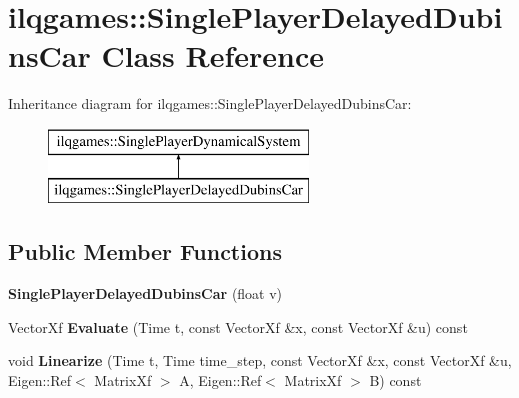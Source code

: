 \hypertarget{classilqgames_1_1_single_player_delayed_dubins_car}{}\section{ilqgames\+:\+:Single\+Player\+Delayed\+Dubins\+Car Class Reference}
\label{classilqgames_1_1_single_player_delayed_dubins_car}
Inheritance diagram for ilqgames\+:\+:Single\+Player\+Delayed\+Dubins\+Car\+:\begin{figure}[H]
\begin{center}
\leavevmode
\includegraphics[height=2.000000cm]{classilqgames_1_1_single_player_delayed_dubins_car}
\end{center}
\end{figure}
\subsection*{Public Member Functions}
\begin{DoxyCompactItemize}
\item 
{\bfseries Single\+Player\+Delayed\+Dubins\+Car} (float v)\hypertarget{classilqgames_1_1_single_player_delayed_dubins_car_aa6ba6ca3a5e0b6c80d9199e2c12ced47}{}\label{classilqgames_1_1_single_player_delayed_dubins_car_aa6ba6ca3a5e0b6c80d9199e2c12ced47}

\item 
Vector\+Xf {\bfseries Evaluate} (Time t, const Vector\+Xf \&x, const Vector\+Xf \&u) const \hypertarget{classilqgames_1_1_single_player_delayed_dubins_car_a6540f0ba900dfd2e49e920a066646a39}{}\label{classilqgames_1_1_single_player_delayed_dubins_car_a6540f0ba900dfd2e49e920a066646a39}

\item 
void {\bfseries Linearize} (Time t, Time time\+\_\+step, const Vector\+Xf \&x, const Vector\+Xf \&u, Eigen\+::\+Ref$<$ Matrix\+Xf $>$ A, Eigen\+::\+Ref$<$ Matrix\+Xf $>$ B) const \hypertarget{classilqgames_1_1_single_player_delayed_dubins_car_a74f59a5a3ea939832b0fab1c37ee48c8}{}\label{classilqgames_1_1_single_player_delayed_dubins_car_a74f59a5a3ea939832b0fab1c37ee48c8}

\end{DoxyCompactItemize}

